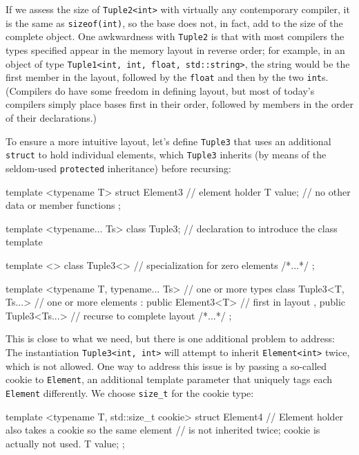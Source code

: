 \noindent If we assess the size of \lstinline!Tuple2<int>! with virtually any
contemporary compiler, it is the same as \lstinline!sizeof(int)!, so the
base does not, in fact, add to the size of the complete object. One
awkwardness with \lstinline!Tuple2! is that with most compilers the types
specified appear in the memory layout in reverse order; for example, in
an object of type\linebreak%
\lstinline!Tuple1<int,!~\lstinline!int,!~\lstinline!float,!~\lstinline!std::string>!,
the string would be the first member in the layout, followed by the
\lstinline!float! and then by the two \lstinline!int!s. (Compilers do have
some freedom in defining layout, but most of today's compilers simply
place bases first in their order, followed by members in the order of
their declarations.)

To ensure a more intuitive layout, let's define \lstinline!Tuple3! that
uses an additional \lstinline!struct! to hold individual elements, which
\lstinline!Tuple3! inherits (by means of the seldom-used \lstinline!protected!
inheritance) before recursing:

\begin{emcppslisting}[emcppsbatch=e37]
template <typename T>
struct Element3      // element holder
{
    T value;         // no other data or member functions
};

template <typename... Ts>
class Tuple3;        // declaration to introduce the class template

template <>
class Tuple3<>       // specialization for zero elements
{ /*...*/ };

template <typename T, typename... Ts>  // one or more types
class Tuple3<T, Ts...>                 // one or more elements
    : public Element3<T>               // first in layout
    , public Tuple3<Ts...>             // recurse to complete layout
{ /*...*/ };
\end{emcppslisting}
    

\noindent This is close to what we need, but there is one additional problem to
address: The instantiation \lstinline!Tuple3<int,!~\lstinline!int>! will
attempt to inherit \lstinline!Element<int>! twice, which is not allowed.
One way to address this issue is by passing a so-called cookie to
\lstinline!Element!, an additional template parameter that uniquely tags
each \lstinline!Element! differently. We choose \lstinline!size_t! for the
cookie type:

\begin{emcppslisting}[emcppsbatch=e37]
template <typename T, std::size_t cookie>
struct Element4      // Element holder also takes a cookie so the same element
                     // is not inherited twice; cookie is actually not used.
{
    T value;
};
\end{emcppslisting}
    

